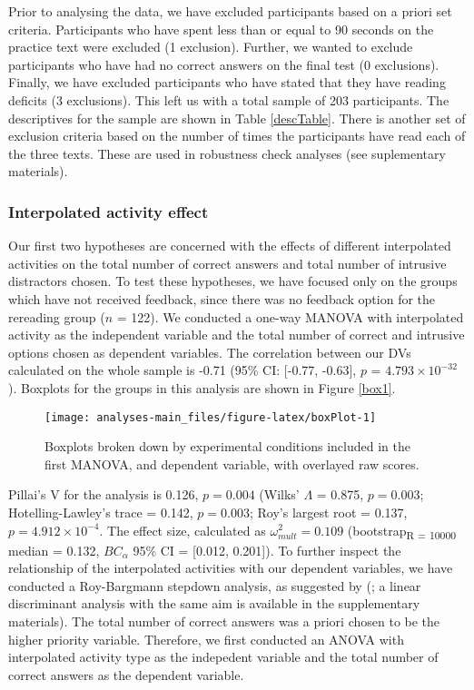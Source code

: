 \documentclass[11pt,]{article}
\begin{document}
Prior to analysing the data, we have excluded participants based on a
priori set criteria. Participants who have spent less than or equal to
90 seconds on the practice text were excluded (1 exclusion). Further, we
wanted to exclude participants who have had no correct answers on the
final test (0 exclusions). Finally, we have excluded participants who
have stated that they have reading deficits (3 exclusions). This left us
with a total sample of 203 participants. The descriptives for the sample
are shown in Table \ref{descTable}. There is another set of exclusion
criteria based on the number of times the participants have read each of
the three texts. These are used in robustness check analyses (see
suplementary materials).

\hypertarget{interpolated-activity-effect}{%
\subsubsection{Interpolated activity
effect}\label{interpolated-activity-effect}}

Our first two hypotheses are concerned with the effects of different
interpolated activities on the total number of correct answers and total
number of intrusive distractors chosen. To test these hypotheses, we
have focused only on the groups which have not received feedback, since
there was no feedback option for the rereading group (\(n\) = 122). We
conducted a one-way MANOVA with interpolated activity as the independent
variable and the total number of correct and intrusive options chosen as
dependent variables. The correlation between our DVs calculated on the
whole sample is -0.71 (95\% CI: {[}-0.77, -0.63{]}, \(p\) =
\(4.793\times 10^{-32}\)). Boxplots for the groups in this analysis are
shown in Figure \ref{box1}.

\begin{figure*}[h]

{\centering \texttt{[image: analyses-main\_files/figure-latex/boxPlot-1]} 

}

\caption{\label{box1} Boxplots broken down by experimental conditions included in the first MANOVA, and dependent variable, with overlayed raw scores.}\label{fig:boxPlot}
\end{figure*}

Pillai's V for the analysis is 0.126, \(p = 0.004\) (Wilks' \(\Lambda\)
= 0.875, \(p = 0.003\); Hotelling-Lawley's trace = 0.142, \(p = 0.003\);
Roy's largest root = 0.137, \(p = 4.912\times 10^{-4}\). The effect
size, calculated as \(\omega^2_{mult} = 0.109\)
(bootstrap\textsubscript{R = 10000} median = 0.132, \(BC_\alpha\) 95\%
CI = {[}0.012, 0.201{]}). To further inspect the relationship of the
interpolated activities with our dependent variables, we have conducted
a Roy-Bargmann stepdown analysis, as suggested by
\citeauthor{tabachnick_using_2012} (\citeyear{tabachnick_using_2012}; a
linear discriminant analysis with the same aim is available in the
supplementary materials). The total number of correct answers was a
priori chosen to be the higher priority variable. Therefore, we first
conducted an ANOVA with interpolated activity type as the indepedent
variable and the total number of correct answers as the dependent
variable.
\end{document}
